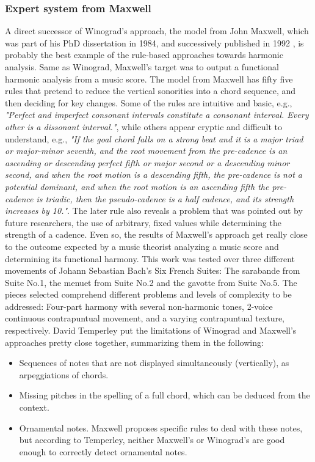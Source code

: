     \subsubsection{Expert system from Maxwell}
    A direct successor of Winograd's approach, the model from John Maxwell, which was part of his PhD dissertation in 1984, and successively published in 1992 \cite{maxwell1992expert}, is probably the best example of the rule-based approaches towards harmonic analysis. Same as Winograd, Maxwell's target was to output a functional harmonic analysis from a music score. The model from Maxwell has fifty five rules that pretend to reduce the vertical sonorities into a chord sequence, and then deciding for key changes. Some of the rules are intuitive and basic, e.g., \emph{"Perfect and imperfect consonant intervals constitute a consonant interval. Every other is a dissonant interval."}, while others appear cryptic and difficult to understand, e.g., \emph{"If the goal chord falls on a strong beat and it is a major triad or major-minor seventh, and the root movement from the pre-cadence is an ascending or descending perfect fifth or major second or a descending minor second, and when the root motion is a descending fifth, the pre-cadence is not a potential dominant, and when the root motion is an ascending fifth the pre-cadence is triadic, then the pseudo-cadence is a half cadence, and its strength increases by 10."}.
    The later rule also reveals a problem that was pointed out by future researchers, the use of arbitrary, fixed values while determining the strength of a cadence. Even so, the results of Maxwell's approach get really close to the outcome expected by a music theorist analyzing a music score and determining its functional harmony. This work was tested over three different movements of Johann Sebastian Bach's Six French Suites: The sarabande from Suite No.1, the menuet from Suite No.2 and the gavotte from Suite No.5. The pieces selected comprehend different problems and levels of complexity to be addressed: Four-part harmony with several non-harmonic tones, 2-voice continuous contrapuntual movement, and a varying contrapuntual texture, respectively. David Temperley put the limitations of Winograd and Maxwell's approaches pretty close together, summarizing them in the following:
		\begin{itemize}
			\item Sequences of notes that are not displayed simultaneously (vertically), as arpeggiations of chords.
			\item Missing pitches in the spelling of a full chord, which can be deduced from the context.
			\item Ornamental notes. Maxwell proposes specific rules to deal with these notes, but according to Temperley, neither Maxwell's or Winograd's are good enough to correctly detect ornamental notes.
    \end{itemize}

